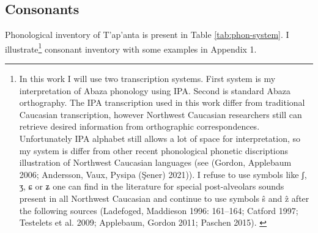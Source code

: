 \documentclass[
]{article}
\begin{document}
\hypertarget{consonants}{%
\subsection{Consonants}\label{consonants}}

Phonological inventory of T'ap'anta is present in Table
\ref{tab:phon-system}. I illustrate\footnote{In this work I will use two
  transcription systems. First system is my interpretation of Abaza
  phonology using IPA. Second is standard Abaza orthography. The IPA
  transcription used in this work differ from traditional Caucasian
  transcription, however Northwest Caucasian researchers still can
  retrieve desired information from orthographic correspondences.
  Unfortunately IPA alphabet still allows a lot of space for
  interpretation, so my system is differ from other recent phonological
  phonetic discriptions illustration of Northwest Caucasian languages
  (see (Gordon, Applebaum 2006; Andersson, Vaux, Pysipa (Şener) 2021)).
  I refuse to use symbols like ʃ, ʒ, ɕ or ʑ one can find in the
  literature for special post-alveolars sounds present in all Northwest
  Caucasian and continue to use symbols ŝ and ẑ after the following
  sources (Ladefoged, Maddieson 1996: 161--164; Catford 1997; Testelets
  et al. 2009; Applebaum, Gordon 2011; Paschen 2015).
  \label{trans-system}} consonant inventory with some examples in
Appendix 1.
\end{document}
